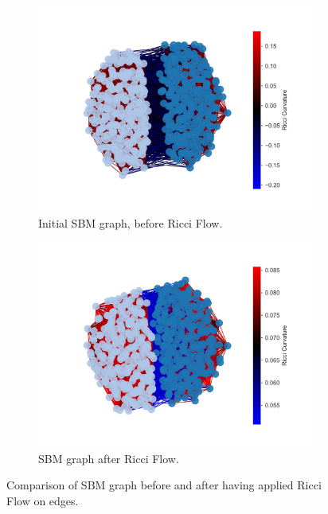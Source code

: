 \begin{figure}
    \centering
    \begin{subfigure}{0.45\textwidth}
        \centering
        \includegraphics[width=\textwidth]{../tests/ToyModelResults/SBM/Before Ricci Flow.png}
        \caption{Initial SBM graph, before Ricci Flow.}
    \end{subfigure}
    \hfill
    \begin{subfigure}{0.45\textwidth}
        \centering
        \includegraphics[width=\textwidth]{../tests/ToyModelResults/SBM/After Ricci Flow.png}
        \caption{SBM graph after Ricci Flow.}
    \end{subfigure}
    \caption{Comparison of SBM graph before and after having applied Ricci Flow on edges.}
\end{figure}
\label{fig:SBM_comparison}

